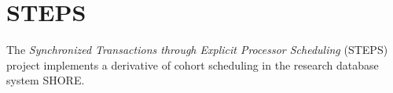 \documentclass[12pt,a4paper]{book}
\begin{document}

\section{STEPS}

The \emph{Synchronized Transactions through Explicit Processor Scheduling} (STEPS) project implements a derivative of cohort scheduling in the research database system SHORE.~\cite{steps,shore}
\end{document}
